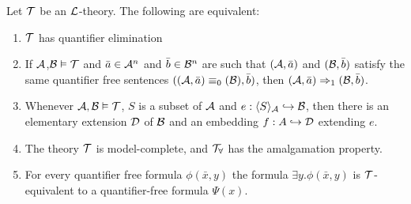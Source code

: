 \documentclass{article}
\numberwithin{thm}{subsection}
\begin{document}
 \begin{fancythm}{}
    Let $\mathcal{T}$ be an $\mathcal{L}$-theory. The following are equivalent: \begin{enumerate}
        \item[(a)] $\mathcal{T}$ has quantifier elimination 
        \item[(b)] If $\mathcal{A}$,$\mathcal{B} \vDash \mathcal{T}$ and $\bar a \in \mathcal{A}^{n}$ and $\bar b \in \mathcal{B}^{n}$ are such that $(\mathcal{A}, \bar a)$ and $(\mathcal{B}, \bar b)$ satisfy the same quantifier free sentences $((\mathcal{A},\bar a) \equiv_{0} (\mathcal{B}), \bar b)$, then $(\mathcal{A}, \bar a) \Rightarrow_{1} (\mathcal{B}, \bar b)$.
        \item[(c)] Whenever $\mathcal{A}, \mathcal{B} \vDash \mathcal{T}$, $S$ is a subset of $\mathcal{A}$ and $e: \langle S \rangle_{\mathcal{A}} \hookrightarrow \mathcal{B}$, then there is an elementary extension $\mathcal{D}$ of $\mathcal{B}$ and an embedding $f: A \hookrightarrow \mathcal{D}$ extending $e$.
        \item[(d)] The theory $\mathcal{T}$ is model-complete, and $\mathcal{T}_{\forall}$ has the amalgamation property.
        \item[(e)] For every quantifier free formula $\phi(\bar x,y)$ the formula $\exists y. \phi(\bar x, y)$ is $\mathcal{T}$-equivalent to a quantifier-free formula $\Psi(x)$.
    \end{enumerate}
 \end{fancythm}
\end{document}
